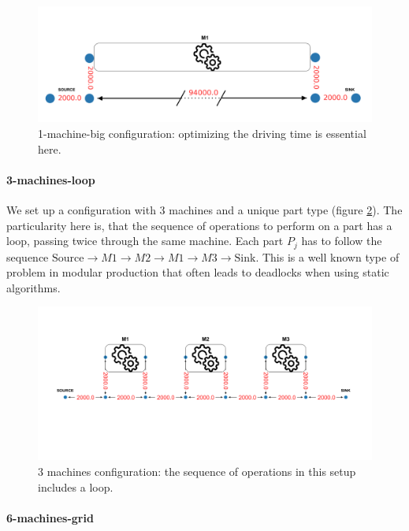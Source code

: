 \documentclass[sn-mathphys]{sn-jnl}
\begin{document}
\begin{figure}[ht]
  \includegraphics[width=1.0\textwidth]{plan_1_machine_big.png}
  \caption{1-machine-big configuration: optimizing the driving time is essential here.}
  \label{fig:plan_1_machine_big}
\end{figure}

\paragraph{3-machines-loop}

We set up a configuration with 3 machines and a unique part type (figure \ref{fig:plan_3_machines}). The particularity here is, that the sequence of operations to perform on a part has a loop, passing twice through the same machine. Each part $P_{j}$ has to follow the sequence $\text{Source} \rightarrow M1 \rightarrow M2 \rightarrow M1 \rightarrow M3 \rightarrow \text{Sink}$. This is a well known type of problem in modular production that often leads to deadlocks when using static algorithms.

\begin{figure}[ht]
  \includegraphics[width=1.0\textwidth]{plan_3_machines.png}
  \caption{3 machines configuration: the sequence of operations in this setup includes a loop.}
  \label{fig:plan_3_machines}
\end{figure}

\paragraph{6-machines-grid}
\end{document}
